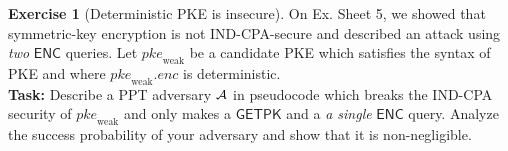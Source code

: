 \documentclass[envcountsame,runningheads,notitlepage]{../llncs}
\theoremstyle{definition}
\newtheorem{graded}[crossed]{Exercise}
\renewcommand{\O}[1]{\ensuremath{\mathsf{#1}}}
\newcommand{\V}[1]{\ensuremath{\mathit{#1}}}
\renewcommand{\O}[1]{\ensuremath{\mathsf{#1}}}
\newcommand{\StyleModel}[1]{\V{{#1}}}
\newcommand{\pke}{\StyleModel{pke}}
\renewcommand{\enc}{\StyleModel{enc}}
\begin{document}

\begin{graded}[Deterministic PKE is insecure]
On Ex. Sheet 5, we showed that symmetric-key encryption is not IND-CPA-secure and described
an attack using \emph{two} $\O{ENC}$ queries. Let $\pke_{\text{weak}}$ be a candidate
PKE which satisfies the syntax of PKE and where $\pke_{\text{weak}}.\enc$ is deterministic.\\

\noindent
\textbf{Task:} Describe a PPT adversary $\mathcal{A}$ in pseudocode which breaks the IND-CPA security of
$\pke_{\text{weak}}$ and only makes a $\O{GETPK}$ and a
 \emph{a single} $\O{ENC}$ query. Analyze the
success probability of your adversary and show that it is non-negligible.\\

\end{graded}
\end{document}
